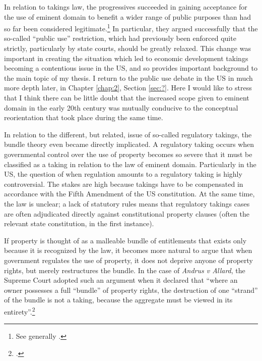 In relation to takings law, the progressives succeeded in gaining acceptance for the use of eminent domain to benefit a wider range of public purposes than had so far been considered legitimate.\footnote{See generally \cite{yale49}.} In particular, they argued successfully that the so-called ``public use'' restriction, which had previously been enforced quite strictly, particularly by state courts, should be greatly relaxed. This change was important in creating the situation which led to economic development takings becoming a contentious issue in the US, and so provides important background to the main topic of my thesis.  I return to the public use debate in the US in much more depth later, in Chapter \ref{chap:2}, Section \ref{sec:?}. Here I would like to stress that I think there can be little doubt that the increased scope given to eminent domain in the early 20th century was mutually conducive to the conceptual reorientation that took place during the same time.

In relation to the different, but related, issue of so-called regulatory takings, the bundle theory even  became directly implicated. A regulatory taking occurs when governmental control over the use of property becomes so severe that it must be classified as a taking in relation to the law of eminent domain. Particularly in the US, the question of when regulation amounts to a regulatory taking is highly controversial. The stakes are high because takings have to be compensated in accordance with the Fifth Amendment of the US constitution. At the same time, the law is unclear; a lack of statutory rules means that regulatory takings cases are often adjudicated directly against constitutional property clauses (often the relevant state constitution, in the first instance).

If property is thought of as a malleable bundle of entitlements that exists only because it is recognized by the law, it becomes more natural to argue that when government regulates the use of property, it does not deprive anyone of property rights, but merely restructures the bundle. In the case of {\it Andrus v Allard}, the Supreme Court adopted such an argument when it declared that ``where an owner possesses a full ``bundle'' of property rights, the destruction of one ``strand'' of the bundle is not a taking, because the aggregate must be viewed in its entirety''.\footcite[65--66]{andrus79}

